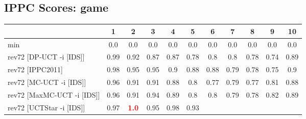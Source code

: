 \documentclass{article}
\begin{document}
\bigskip

\subsection*{IPPC Scores: game}

\begin{tabular}{|l|r@{$\pm$}rr@{$\pm$}rr@{$\pm$}rr@{$\pm$}rr@{$\pm$}rr@{$\pm$}rr@{$\pm$}rr@{$\pm$}rr@{$\pm$}rr@{$\pm$}r|}
\hline

& \multicolumn{2}{c}{1}
& \multicolumn{2}{c}{2}
& \multicolumn{2}{c}{3}
& \multicolumn{2}{c}{4}
& \multicolumn{2}{c}{5}
& \multicolumn{2}{c}{6}
& \multicolumn{2}{c}{7}
& \multicolumn{2}{c}{8}
& \multicolumn{2}{c}{9}
& \multicolumn{2}{c|}{10}
\\
\hline
\hline
min
& \multicolumn{2}{c}{0.0}
& \multicolumn{2}{c}{0.0}
& \multicolumn{2}{c}{0.0}
& \multicolumn{2}{c}{0.0}
& \multicolumn{2}{c}{0.0}
& \multicolumn{2}{c}{0.0}
& \multicolumn{2}{c}{0.0}
& \multicolumn{2}{c}{0.0}
& \multicolumn{2}{c}{0.0}
& \multicolumn{2}{c|}{0.0}
\\
rev72 [DP-UCT -i [IDS]]
& \multicolumn{2}{c}{0.99}
& \multicolumn{2}{c}{0.92}
& \multicolumn{2}{c}{0.87}
& \multicolumn{2}{c}{0.87}
& \multicolumn{2}{c}{0.78}
& \multicolumn{2}{c}{0.8}
& \multicolumn{2}{c}{0.8}
& \multicolumn{2}{c}{0.78}
& \multicolumn{2}{c}{0.74}
& \multicolumn{2}{c|}{0.89}
\\
rev72 [IPPC2011]
& \multicolumn{2}{c}{0.98}
& \multicolumn{2}{c}{0.95}
& \multicolumn{2}{c}{0.95}
& \multicolumn{2}{c}{0.9}
& \multicolumn{2}{c}{0.88}
& \multicolumn{2}{c}{0.88}
& \multicolumn{2}{c}{0.79}
& \multicolumn{2}{c}{0.78}
& \multicolumn{2}{c}{0.75}
& \multicolumn{2}{c|}{0.9}
\\
rev72 [MC-UCT -i [IDS]]
& \multicolumn{2}{c}{0.96}
& \multicolumn{2}{c}{0.91}
& \multicolumn{2}{c}{0.91}
& \multicolumn{2}{c}{0.88}
& \multicolumn{2}{c}{0.8}
& \multicolumn{2}{c}{0.77}
& \multicolumn{2}{c}{0.79}
& \multicolumn{2}{c}{0.77}
& \multicolumn{2}{c}{0.81}
& \multicolumn{2}{c|}{0.88}
\\
rev72 [MaxMC-UCT -i [IDS]]
& \multicolumn{2}{c}{0.96}
& \multicolumn{2}{c}{0.91}
& \multicolumn{2}{c}{0.94}
& \multicolumn{2}{c}{0.89}
& \multicolumn{2}{c}{0.8}
& \multicolumn{2}{c}{0.8}
& \multicolumn{2}{c}{0.79}
& \multicolumn{2}{c}{0.78}
& \multicolumn{2}{c}{0.82}
& \multicolumn{2}{c|}{0.89}
\\
rev72 [UCTStar -i [IDS]]
& \multicolumn{2}{c}{0.97}
& \multicolumn{2}{c}{\textbf{\textcolor{red}{1.0}}}
& \multicolumn{2}{c}{0.95}
& \multicolumn{2}{c}{0.98}
& \multicolumn{2}{c}{0.93}

\end{tabular}
\end{document}
